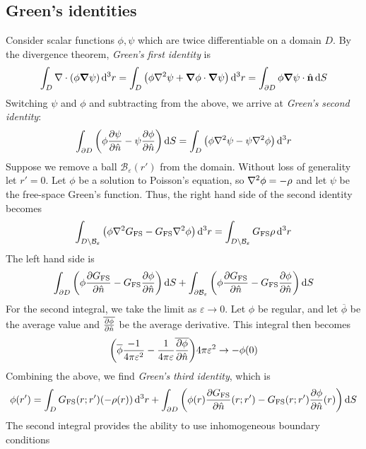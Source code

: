 \documentclass[a4paper]{article}
\begin{document}
\subsection{Green's identities}
Consider scalar functions \( \phi, \psi \) which are twice differentiable on a domain \( D \).
By the divergence theorem, \textit{Green's first identity} is
\[
	\int_D \div(\phi \grad{\psi}) \dd[3]{r} = \int_D \qty(\phi \laplacian{\psi} + \grad{\phi} \cdot \grad{\psi}) \dd[3]{r} = \int_{\partial D} \phi \grad{\psi} \cdot \hat \bfn \dd{S}
\]
Switching \( \psi \) and \( \phi \) and subtracting from the above, we arrive at \textit{Green's second identity}:
\[
	\int_{\partial D} \qty(\phi \pdv{\psi}{\hat n} - \psi \pdv{\phi}{\hat n}) \dd{S} = \int_D \qty(\phi \laplacian{\psi} - \psi \laplacian{\phi}) \dd[3]{r}
\]
Suppose we remove a ball \( \mathcal B_\varepsilon(r') \) from the domain.
Without loss of generality let \( r' = 0 \).
Let \( \phi \) be a solution to Poisson's equation, so \( \laplacian{\phi} = -\rho \) and let \( \psi \) be the free-space Green's function.
Thus, the right hand side of the second identity becomes
\[
	\int_{D \setminus \mathcal B_\varepsilon} \qty(\phi \laplacian{G_{\mathrm{FS}}} - G_{\mathrm{FS}} \laplacian{\phi}) \dd[3]{r} = \int_{D \setminus \mathcal B_\varepsilon} G_{\mathrm{FS}} \rho \dd[3]{r}
\]
The left hand side is
\[
	\int_{\partial D} \qty(\phi \pdv{G_{\mathrm{FS}}}{\hat n} - G_{\mathrm{FS}} \pdv{\phi}{\hat n}) \dd{S} + \int_{\partial \mathcal B_\varepsilon} \qty(\phi \pdv{G_{\mathrm{FS}}}{\hat n} - G_{\mathrm{FS}} \pdv{\phi}{\hat n}) \dd{S}
\]
For the second integral, we take the limit as \( \varepsilon \to 0 \).
Let \( \phi \) be regular, and let \( \overline\phi \) be the average value and \( \overline{\pdv{\phi}{\hat n}} \) be the average derivative.
This integral then becomes
\[
	\qty(\overline\phi \frac{-1}{4 \pi \varepsilon^2} - \frac{1}{4 \pi \varepsilon} \overline{\pdv{\phi}{\hat n}}) 4 \pi \varepsilon^2 \to -\phi(0)
\]
Combining the above, we find \textit{Green's third identity}, which is
\[
	\phi(r') = \int_D G_{\mathrm{FS}}(r;r')  \qty(-\rho(r)) \dd[3]{r} + \int_{\partial D} \qty(\phi(r) \pdv{G_{\mathrm{FS}}}{\hat n} \qty(r;r') - G_{\mathrm{FS}}(r;r') \pdv{\phi}{\hat n}\qty(r)) \dd{S}
\]
The second integral provides the ability to use inhomogeneous boundary conditions
\end{document}
